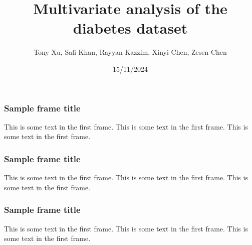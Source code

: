 \documentclass{beamer}
\title{Multivariate analysis of the diabetes dataset}
\author{Tony Xu, Safi Khan, Rayyan Kazzim, Xinyi Chen, Zesen Chen}
\institute{McMaster University}
\date{15/11/2024}
\begin{document}
\frame{\titlepage}

\begin{frame}
\frametitle{Sample frame title}
This is some text in the first frame. This is some text in the first frame. This is some text in the first frame.
\end{frame}

\begin{frame}
    \frametitle{Sample frame title}
    This is some text in the first frame. This is some text in the first frame. This is some text in the first frame.
\end{frame}

\begin{frame}
    \frametitle{Sample frame title}
    This is some text in the first frame. This is some text in the first frame. This is some text in the first frame.
\end{frame}
\end{document}
